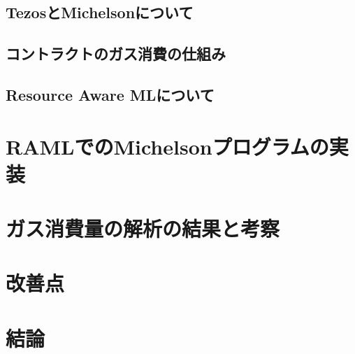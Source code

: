 \documentclass{kuisthesis}
\begin{document}
\subsection{TezosとMichelsonについて}\label{subsec-pre-tezos}

\subsection{コントラクトのガス消費の仕組み}\label{subsec-pre-gas}

\subsection{Resource Aware MLについて}\label{subsec-pre-raml}

\section{RAMLでのMichelsonプログラムの実装}

\section{ガス消費量の解析の結果と考察}

\section{改善点}

\section{結論}\label{sec-conclusion}

\acknowledgments

\nocite{*}


\end{document}
